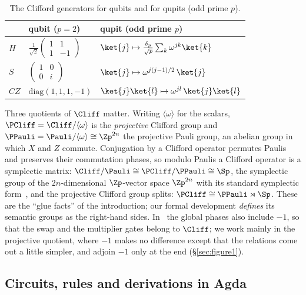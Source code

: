 \begin{table}[h]
\caption{The Clifford generators for qubits and for qupits (odd prime $p$).}
\label{tab:gates}
\centering
\begin{tabular}{lll}
\toprule
 & qubit ($p = 2$) & qupit (odd prime $p$) \\
\midrule
$H$  & $\frac{1}{\sqrt2}\begin{pmatrix}1&1\\1&-1\end{pmatrix}$
     & $\ket{j} \mapsto \tfrac{\delta_p}{\sqrt p}\sum_k \omega^{jk}\ket{k}$ \\[2ex]
$S$  & $\begin{pmatrix}1&0\\0&i\end{pmatrix}$
     & $\ket{j} \mapsto \omega^{j(j-1)/2}\,\ket{j}$ \\[2ex]
$CZ$ & $\mathrm{diag}(1,1,1,-1)$
     & $\ket{j}\ket{l} \mapsto \omega^{jl}\,\ket{j}\ket{l}$ \\
\bottomrule
\end{tabular}
\end{table}

Three quotients of $\Cliff$ matter.  Writing $\langle\omega\rangle$ for
the scalars, $\PCliff = \Cliff/\langle\omega\rangle$ is the
\emph{projective} Clifford group and $\PPauli =
\Pauli/\langle\omega\rangle \cong \Zp^{2n}$ the projective Pauli group,
an abelian group in which $X$ and $Z$ commute.  Conjugation by a Clifford
operator permutes Paulis and preserves their commutation phases, so
modulo Paulis a Clifford operator is a symplectic matrix: $\Cliff/\Pauli
\cong \PCliff/\PPauli \cong \Sp$, the symplectic group of the
$2n$-dimensional $\Zp$-vector space $\Zp^{2n}$ with its standard
symplectic form~\cite{bian2026qudit}, and the projective Clifford group
splits: $\PCliff \cong \PPauli \rtimes \Sp$.  These are the ``glue
facts'' of the introduction; our formal development \emph{defines} its
semantic groups as the right-hand sides.  In~\cite{bian2026qudit} the
global phases also include $-1$, so that the swap and the multiplier
gates belong to $\Cliff$; we work mainly in the projective quotient,
where $-1$ makes no difference except that the relations come out a
little simpler, and adjoin $-1$ only at the end (\S\ref{sec:figure1}).

\subsection{Circuits, rules and derivations in Agda}\label{sec:encoding}

